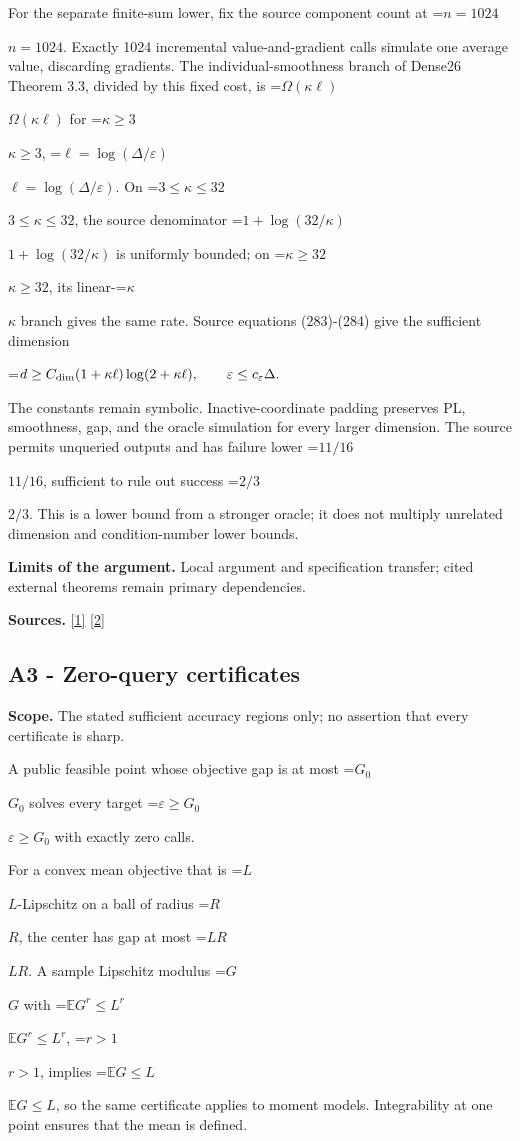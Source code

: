 \documentclass[10pt,a4paper]{article}
\newcommand{\AtlasMath}[1]{\par\begingroup\centering\setbox0=\hbox{$\displaystyle #1$}\ifdim\wd0>1.4\linewidth\typeout{ATLAS WIDE FORMULA: \the\wd0}\fi\ifdim\wd0>\linewidth\resizebox{\linewidth}{!}{\box0}\else\box0\fi\par\endgroup}
\newcommand{\AtlasInlineMath}[1]{\begingroup\setbox0=\hbox{$#1$}\ifdim\wd0>.4\linewidth\endgroup\AtlasMath{#1}\else\endgroup$#1$\fi}
\begin{document}
For the separate finite-sum lower, fix the source component count at \AtlasInlineMath{n=1024}. Exactly 1024 incremental value-and-gradient calls simulate one average value, discarding gradients. The individual-smoothness branch of Dense26 Theorem 3.3, divided by this fixed cost, is \AtlasInlineMath{\Omega(\kappa\ell)} for \AtlasInlineMath{\kappa\ge3}, \AtlasInlineMath{\ell=\log(\Delta/\varepsilon)}. On \AtlasInlineMath{3\le\kappa\le32}, the source denominator \AtlasInlineMath{1+\log(32/\kappa)} is uniformly bounded; on \AtlasInlineMath{\kappa\ge32}, its linear-\AtlasInlineMath{\kappa} branch gives the same rate. Source equations (283)-(284) give the sufficient dimension

\AtlasMath{d\ge C_{\rm dim}(1+\kappa\ell)\log(2+\kappa\ell),\qquad\varepsilon\le c_\varepsilon\Delta.}

The constants remain symbolic. Inactive-coordinate padding preserves PL, smoothness, gap, and the oracle simulation for every larger dimension. The source permits unqueried outputs and has failure lower \AtlasInlineMath{11/16}, sufficient to rule out success \AtlasInlineMath{2/3}. This is a lower bound from a stronger oracle; it does not multiply unrelated dimension and condition-number lower bounds.

\textbf{Limits of the argument.} Local argument and specification transfer; cited external theorems remain primary dependencies.

\textbf{Sources.} \href{https://arxiv.org/html/2610.00345v1}{[1]} \href{https://arxiv.org/html/2609.00045v3}{[2]}

\subsection{A3 - Zero-query certificates}
\textbf{Scope.} The stated sufficient accuracy regions only; no assertion that every certificate is sharp.

A public feasible point whose objective gap is at most \AtlasInlineMath{G_0} solves every target \AtlasInlineMath{\varepsilon\ge G_0} with exactly zero calls.

For a convex mean objective that is \AtlasInlineMath{L}-Lipschitz on a ball of radius \AtlasInlineMath{R}, the center has gap at most \AtlasInlineMath{LR}. A sample Lipschitz modulus \AtlasInlineMath{G} with \AtlasInlineMath{\mathbb E G^r\le L^r}, \AtlasInlineMath{r>1}, implies \AtlasInlineMath{\mathbb E G\le L}, so the same certificate applies to moment models. Integrability at one point ensures that the mean is defined.
\end{document}
